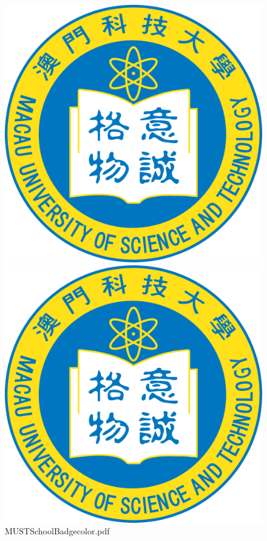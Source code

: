 \documentclass[12pt, a4paper]{report}
\begin{document}
\begin{figure}[!htbp]
	\begin{minipage}[t]{0.5\linewidth}
		\centering
		\includegraphics[width=\textwidth]{figure/MUSTSchoolBadgecolor.pdf}
	\end{minipage}
	\begin{minipage}[t]{0.5\linewidth}
		\centering
		\includegraphics[width=\textwidth]{figure/MUSTSchoolBadgecolor.pdf}
	\end{minipage}
	\caption{MUSTSchoolBadgecolor.pdf} 
	\label{fig:MUST1}
\end{figure}
\end{document}
